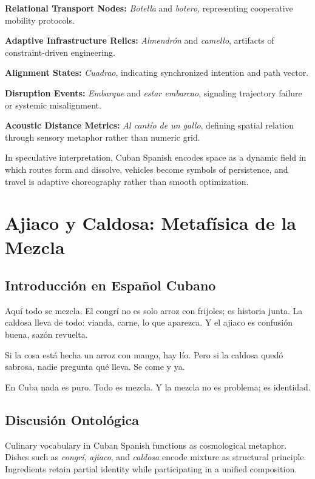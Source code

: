\documentclass[12pt]{article}
\begin{document}
\textbf{Relational Transport Nodes:} \textit{Botella} and \textit{botero}, representing cooperative mobility protocols.

\textbf{Adaptive Infrastructure Relics:} \textit{Almendrón} and \textit{camello}, artifacts of constraint-driven engineering.

\textbf{Alignment States:} \textit{Cuadrao}, indicating synchronized intention and path vector.

\textbf{Disruption Events:} \textit{Embarque} and \textit{estar embarcao}, signaling trajectory failure or systemic misalignment.

\textbf{Acoustic Distance Metrics:} \textit{Al cantío de un gallo}, defining spatial relation through sensory metaphor rather than numeric grid.

In speculative interpretation, Cuban Spanish encodes space as a dynamic field in which routes form and dissolve, vehicles become symbols of persistence, and travel is adaptive choreography rather than smooth optimization.

\section{Ajiaco y Caldosa: Metafísica de la Mezcla}

\subsection*{Introducción en Español Cubano}

Aquí todo se mezcla. El congrí no es solo arroz con frijoles; es historia junta. La caldosa lleva de todo: vianda, carne, lo que aparezca. Y el ajiaco es confusión buena, sazón revuelta.

Si la cosa está hecha un arroz con mango, hay lío. Pero si la caldosa quedó sabrosa, nadie pregunta qué lleva. Se come y ya.

En Cuba nada es puro. Todo es mezcla. Y la mezcla no es problema; es identidad.

\subsection*{Discusión Ontológica}

Culinary vocabulary in Cuban Spanish functions as cosmological metaphor. Dishes such as \textit{congrí}, \textit{ajiaco}, and \textit{caldosa} encode mixture as structural principle. Ingredients retain partial identity while participating in a unified composition.
\end{document}
